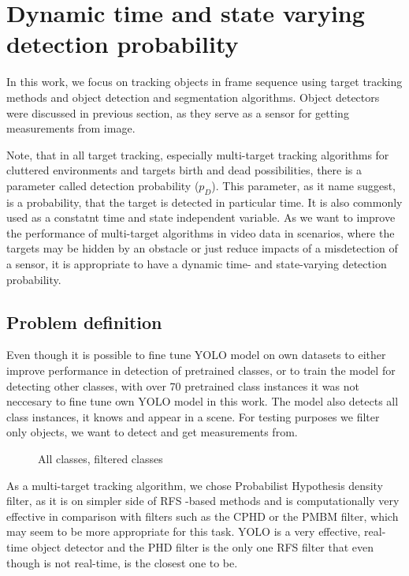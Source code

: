 \chapter{Dynamic time and state varying detection probability}
In this work, we focus on tracking objects in frame sequence using target tracking methods and object detection and
segmentation algorithms. Object detectors were discussed in previous section, as they serve as a sensor for getting
measurements from image.

Note, that in all target tracking, especially multi-target tracking algorithms for cluttered environments and targets
birth and dead possibilities, there is a parameter called detection probability ($p_D$). This parameter, as it name
suggest, is a probability, that the target is detected in particular time. It is also commonly used as a constatnt
time and state independent variable. As we want to improve the performance of multi-target algorithms in video data
in scenarios, where the targets may be hidden by an obstacle or just reduce impacts of a misdetection of a sensor, it
is appropriate to have a dynamic time- and state-varying detection probability.
\section{Problem definition}
Even though it is possible to fine tune YOLO model on own datasets to either improve performance in detection of
pretrained classes, or to train the model for detecting other classes, with over 70 pretrained class instances it was
not neccesary to fine tune own YOLO model in this work. The model also detects all class instances, it knows and
appear in a scene. For testing purposes we filter only objects, we want to detect and get measurements from.
\begin{figure}
  \caption{All classes, filtered classes}
\end{figure}

As a multi-target tracking algorithm, we chose Probabilist Hypothesis density filter, as it is on simpler side of RFS
-based methods and is computationally very effective in comparison with filters such as the CPHD or the PMBM filter,
which may seem
to be more appropriate for this task. YOLO is a very effective, real-time object detector and the PHD filter is the
only one RFS filter that even though is not real-time, is the closest one to be.

